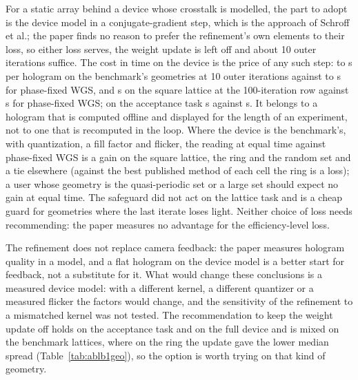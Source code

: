 For a static array behind a device whose crosstalk is modelled, the part to adopt is the device model in a conjugate-gradient step, which is the approach of Schroff et al.; the paper finds no reason to prefer the refinement's own elements to their loss, so either loss serves, the weight update is left off and about 10 outer iterations suffice. The cost in time on the device is the price of any such step: \benchTenSecRefMin{} to \benchTenSecRefMax{} s per hologram on the benchmark's geometries at 10 outer iterations against \benchTenSecMsevenMin{} to \benchTenSecMsevenMax{} s for phase-fixed WGS, and \benchSecGeoOneBOne{} s on the square lattice at the 100-iteration row against \benchSecGeoOneMseven{} s for phase-fixed WGS; on the acceptance task \secBXMedian{} s against \secMXSevenHundred{} s. It belongs to a hologram that is computed offline and displayed for the length of an experiment, not to one that is recomputed in the loop. Where the device is the benchmark's, with quantization, a fill factor and flicker, the reading at equal time against phase-fixed WGS is a gain on the square lattice, the ring and the random set and a tie elsewhere (against the best published method of each cell the ring is a loss); a user whose geometry is the quasi-periodic set or a large set should expect no gain at equal time. The safeguard did not act on the lattice task and is a cheap guard for geometries where the last iterate loses light. Neither choice of loss needs recommending: the paper measures no advantage for the efficiency-level loss.

The refinement does not replace camera feedback: the paper measures hologram quality in a model, and a flat hologram on the device model is a better start for feedback, not a substitute for it. What would change these conclusions is a measured device model: with a different kernel, a different quantizer or a measured flicker the factors would change, and the sensitivity of the refinement to a mismatched kernel was not tested. The recommendation to keep the weight update off holds on the acceptance task and on the full device and is mixed on the benchmark lattices, where on the ring the update gave the lower median spread (Table~\ref{tab:ablb1geo}), so the option is worth trying on that kind of geometry.
